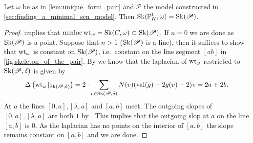 \begin{proposition}
	Let $\omega$ be as in \cref{lem:unique_form_pair} and $\mathscr P$ the model constructed in \cref{sec:finding_a_minimal_scn_model}.
	Then $\operatorname{Sk}(\mathbb{P}^{1}_K, \omega) = \operatorname{Sk}(\mathscr P)$. 
\end{proposition}
\begin{proof}
	 implies that $\operatorname{minloc} \operatorname{wt}_{w} = \operatorname{Sk}(C, \omega) \subset \operatorname{Sk}(\mathscr P) $. 
	If $n = 0$ we are done as $\operatorname{Sk}(\mathscr P) $ is a point. 
	Suppose that $n > 1$ ($\operatorname{Sk}(\mathscr P)$ is a line), then 
	it suffices to show that $\operatorname{wt}_\omega$ is constant on $\operatorname{Sk}(\mathscr P)$, i.e.\ constant on the line segment $[ab]$ in \cref{fig:skeleton_of_the_pair}. 
	By \cite[thm.\ 3.2.3.(3)]{bakerWeightFunctionsBerkovich2016} we know that the laplacian of $\operatorname{wt}_\omega$ restricted to $\operatorname{Sk}(\mathscr P, \delta)$ is given by \[
		\Delta\left(\operatorname{wt}_\omega|_{\operatorname{Sk}(\mathscr P, \delta)}\right) = 2\cdot \sum_{v \in \operatorname{Sk}(\mathscr P, \delta)} N(v)(\operatorname{val} (g) - 2g(v) - 2)v = 2a + 2b
	.\] 
	At $a$ the lines $[0, a],[\lambda, a]$ and  $[a, b]$ meet. 
	The outgoing slopes of  $[0, a], [\lambda, a]$ are both $1$ by \cite[3.2.3.(2)]{bakerWeightFunctionsBerkovich2016}. 
	This implies that the outgoing slop at $a$ on the line$ [a, b]$ is $0$. 
	As the laplacian has no points on the interior of $[a, b]$ the slope remains constant on $[a, b]$ and we are done. 
\end{proof}




